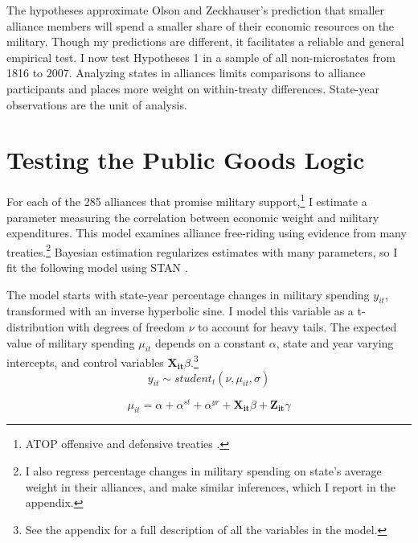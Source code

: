 \documentclass[12pt]{article}
\begin{document}
The hypotheses approximate Olson and Zeckhauser's prediction that smaller alliance members will spend a smaller share of their economic resources on the military. 
Though my predictions are different, it facilitates a reliable and general empirical test.
I now test Hypotheses 1 in a sample of all non-microstates from 1816 to 2007. 
Analyzing states in alliances limits comparisons to alliance participants and places more weight on within-treaty differences. 
State-year observations are the unit of analysis.


\section{Testing the Public Goods Logic}


For each of the 285 alliances that promise military support,\footnote{ATOP offensive and defensive treaties \citep{Leedsetal2002}.} I estimate a parameter measuring the correlation between economic weight and military expenditures. 
This model examines alliance free-riding using evidence from many treaties.\footnote{I also regress percentage changes in military spending on state's average weight in their alliances, and make similar inferences, which I report in the appendix.}
Bayesian estimation regularizes estimates with many parameters, so I fit the following model using STAN \citep{Carpenteretal2016}.


The model starts with state-year percentage changes in military spending $y_{it}$, transformed with an inverse hyperbolic sine.
I model this variable as a t-distribution with degrees of freedom $\nu$ to account for heavy tails.
The expected value of military spending $\mu_{it}$ depends on a constant $\alpha$, state and year varying intercepts, and control variables $\mathbf{X_{it}} \beta$.\footnote{See the appendix for a full description of all the variables in the model.} 
\begin{equation}
y_{it} \sim student_t(\nu, \mu_{it}, \sigma) 
\end{equation}

\begin{equation}
\mu_{it} = \alpha + \alpha^{st} + \alpha^{yr} + \mathbf{X_{it}} \beta + \mathbf{Z_{it}} \gamma
\end{equation}
\end{document}

